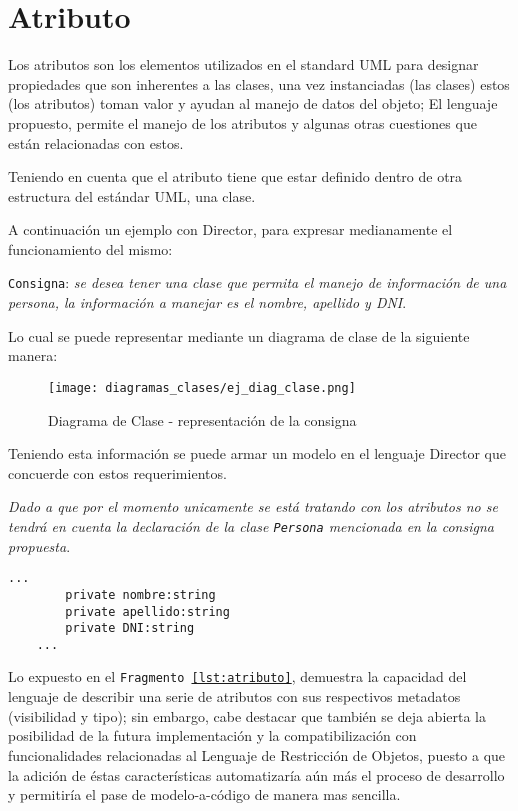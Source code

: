 \section{Atributo}
\label{sec:atributo}

Los atributos son los elementos utilizados en el standard UML para designar
propiedades que son inherentes a las clases, una vez instanciadas (las clases)
estos (los atributos) toman valor y ayudan al manejo de datos del objeto; El
lenguaje propuesto, permite el manejo de los atributos y algunas otras
cuestiones que están relacionadas con estos.

Teniendo en cuenta que el atributo tiene que estar definido dentro de otra
estructura del estándar UML, una clase.

A continuación un ejemplo con Director, para expresar medianamente el
funcionamiento del mismo:\\

\begin{displayquote}
	\texttt{Consigna}: \textit{se desea tener una clase que permita el manejo de
	información de una persona, la información a manejar es el nombre, apellido
	y DNI}.
\end{displayquote}

Lo cual se puede representar mediante un diagrama de clase de la siguiente manera:

\begin{figure}[H]
	\centering
	\texttt{[image: diagramas\_clases/ej\_diag\_clase.png]}
	\caption{Diagrama de Clase - representación de la consigna}
	\label{fig:ej_diag_clase.png}
\end{figure}

Teniendo esta información se puede armar un modelo en el lenguaje Director que
concuerde con estos requerimientos.

\textit{Dado a que por el momento unicamente se está tratando con los atributos
no se tendrá en cuenta la declaración de la clase \texttt{Persona} mencionada
en la consigna propuesta}.

\begin{lstlisting}[caption={Director - Modelado de atributos}, label=lst:atributo]
  ...
		private nombre:string
		private apellido:string
		private DNI:string
	...
\end{lstlisting}

Lo expuesto en el \texttt{Fragmento \ref{lst:atributo}}, demuestra
la capacidad del lenguaje de describir una serie de atributos con sus
respectivos metadatos (visibilidad y tipo); sin embargo, cabe destacar que
también se deja abierta la posibilidad de la futura implementación y
la compatibilización con funcionalidades relacionadas al Lenguaje de
Restricción de Objetos, puesto a que la adición de éstas
características automatizaría aún más el proceso de
desarrollo y permitiría el pase de modelo-a-código de manera mas sencilla.

